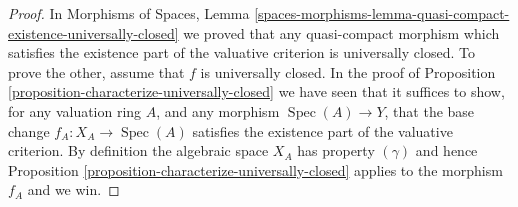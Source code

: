 \documentclass{stacks-project}
\theoremstyle{plain}
\theoremstyle{definition}
\theoremstyle{remark}
\numberwithin{equation}{subsection}
\def\Spec{\mathop{\mathrm{Spec}}}
\begin{document}
\begin{proof}
In
Morphisms of Spaces,
Lemma \ref{spaces-morphisms-lemma-quasi-compact-existence-universally-closed}
we proved that any quasi-compact morphism which satisfies the existence
part of the valuative criterion is universally closed.
To prove the other, assume that $f$ is universally closed.
In the proof of
Proposition \ref{proposition-characterize-universally-closed}
we have seen that it suffices to show, for any valuation ring $A$,
and any morphism $\Spec(A) \to Y$, that the base change
$f_A : X_A \to \Spec(A)$ satisfies the existence part of the valuative
criterion. By definition the algebraic space $X_A$ has property $(\gamma)$
and hence
Proposition \ref{proposition-characterize-universally-closed}
applies to the morphism $f_A$ and we win.
\end{proof}
\end{document}
